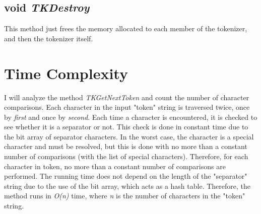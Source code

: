 \documentclass{article}
\begin{document}
\subsection{void \emph{TKDestroy}}
This method just frees the memory allocated to each member of the tokenizer, and then the
tokenizer itself.

\section{Time Complexity}

I will analyze the method \emph{TKGetNextToken} and count the number of character comparisons.
Each character in the input "token" string is traversed twice, once by \emph{first} and once
by \emph{second}. Each time a character is encountered, it is checked to see whether it is a
separator or not. This check is done in constant time due to the bit array of separator
characters. In the worst case, the character is a special character and must be resolved, but
this is done with no more than a constant number of comparisons (with the list of special
characters). Therefore, for each character in token, no more than a constant number of
comparisons are performed. The running time does not depend on the length of the "separator"
string due to the use of the bit array, which acts as a hash table. Therefore, the method
runs in \emph{O(n)} time, where \emph{n} is the number of characters in the "token" string.
\end{document}
